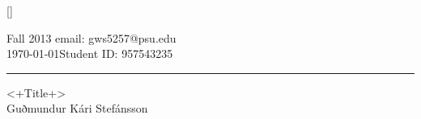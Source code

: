 \documentclass[12pt,a4paper]{article}
\begin{document}
%


\titleformat{\section}{\LARGE\scshape\bfseries\raggedright}{}{0em}{}[\titlerule]
\fancyhf{}
\pagestyle{fancy}


 Fall 2013 \hfill email: gws5257@psu.edu\\
\today \hfill Student ID: 957543235
\rule[8pt]{\textwidth}{1pt}
\begin{center}
	\LARGE{<+Title+>} \\
	\vspace{0.4cm}
	\large{Guðmundur Kári Stefánsson}
\end{center}

\end{document}
